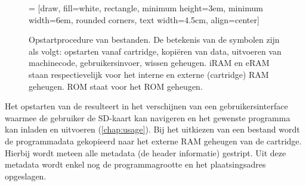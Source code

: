 \begin{figure}[h!]
    \centering

     = [draw, fill=white, rectangle, 
    minimum height=3em, minimum width=6em, rounded corners,
    text width=4.5cm, align=center]

    \tikzset{every picture/.style=thick}
    
    \caption{Opstartprocedure van \cas bestanden. De betekenis van de symbolen zijn als volgt: \faDownload \; opstarten vanaf cartridge, \faCopy \; kopiëren van data, \faCogs \; uitvoeren van machinecode, \faMousePointer \; gebruikersinvoer, \faTrash \; wissen geheugen. iRAM en eRAM staan respectievelijk voor het interne en externe (cartridge) RAM geheugen. ROM staat voor het  ROM geheugen.}
    \label{fig:loading-cas-file}
\end{figure}

Het opstarten van de \launcher resulteert in het verschijnen van een gebruikersinterface waarmee de gebruiker de SD-kaart kan navigeren en het gewenste programma kan inladen en uitvoeren (\cref{chap:usage}). Bij het uitkiezen van een \cas bestand wordt de programmadata gekopieerd naar het externe RAM geheugen van de cartridge. Hierbij wordt meteen alle metadata (de header informatie) gestript. Uit deze metadata wordt enkel nog de programmagrootte en het plaatsingsadres opgeslagen.

